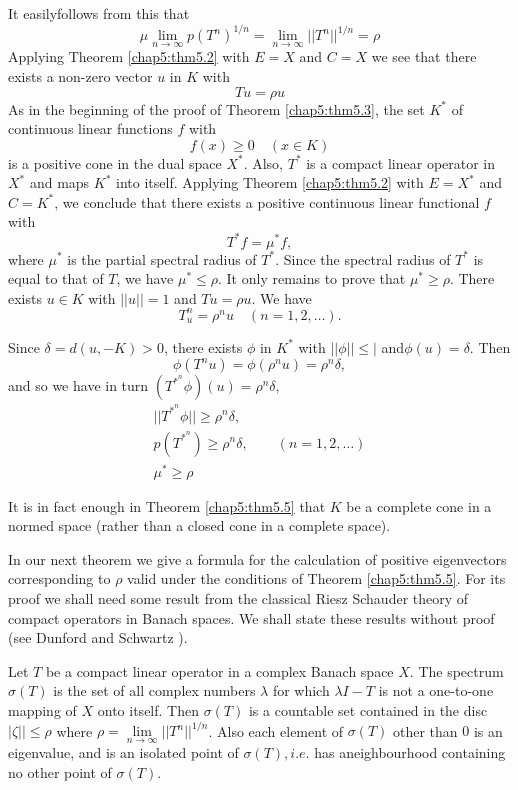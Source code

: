 It easily\pageoriginale follows from this that
$$
\mu \lim_{n \to \infty} p(T^n)^{1/n} = \lim_{n \to \infty} ||T^n||^{1/n} = \rho
$$
Applying Theorem \ref{chap5:thm5.2} with $E=X$ and $C =X$ we see that
there exists a non-zero vector $u$ in $K$ with  
 $$
 Tu = \rho u
 $$
 As in the beginning of the proof of Theorem \ref{chap5:thm5.3}, the
 set $K^*$ of  continuous linear functions $f$ with 
 $$
 f (x) \ge 0 \quad (x \in K)
 $$
is a positive cone in the dual space $X^*$. Also, $T^*$ is a compact
linear operator in $X^*$ and maps $K^*$ into itself. Applying Theorem
\ref{chap5:thm5.2} with $E =X^*$ and $C=K^*$, we conclude that there
exists a positive continuous linear functional $f$ with 
 $$
 T^* f = \mu^* f,
 $$ 
 where $\mu^*$ is the partial spectral radius of $T^*$. Since the
 spectral radius of $T^*$ is equal to that of $T$, we have $\mu^* \le
 \rho$. It only remains to prove that $\mu^* \ge \rho$. There exists
 $u \in K$ with $||u|| =1$ and $Tu =\rho u$. We have 
 $$
 T^n_u = \rho^n u \quad (n=1,2,\ldots).
 $$
 
 Since $\delta = d (u,-K) >0$, there exists $\phi$ in $K^*$ with
 $||\phi|| \le |$ and\pageoriginale $\phi (u) = \delta$. Then 
 $$
 \phi (T^n u) = \phi (\rho^n u) = \rho^n \delta,
 $$
 and so we have in turn $(T^{*^{n}} \phi) (u) = \rho^n \delta$,
 \begin{gather*}
   ||T^{*^{n}} \phi|| \ge \rho^n \delta,\\
   p(T^{*^{n}}) \ge \rho^n \delta, \qquad (n =1,2,\ldots)\\
   \mu^* \ge \rho
 \end{gather*}
 
\begin{remark*}
  It is in fact enough in Theorem \ref{chap5:thm5.5} that $K$ be a
  complete cone in a normed space (rather than a closed cone in a
  complete space).  
\end{remark*}
  
In our next theorem we give a formula for the calculation of positive
eigenvectors corresponding to $\rho$ valid under the conditions of
Theorem \ref{chap5:thm5.5}. For its proof we shall need some result from the
classical Riesz Schauder theory of compact operators in Banach
spaces. We shall state these results without proof (see Dunford and
Schwartz \cite{key14}). 
 
 Let $T$ be a compact linear operator in a complex Banach space
 $X$. The spectrum $\sigma (T)$ is the set of all complex numbers
 $\lambda$ for which $\lambda I -T$ is not a one-to-one mapping of $X$
 onto itself. Then $\sigma (T)$ is a countable set contained in the
 disc $| \zeta|| \le \rho$ where $\rho = \lim\limits_{n \to \infty}
 ||T^n||^{1/n}$. Also each element of $\sigma (T)$ other than $0$ is
 an eigenvalue, and is an isolated point of $\sigma (T), i.e$. has
 a\pageoriginale  neighbourhood containing no other point of $\sigma
 (T)$.  
 

